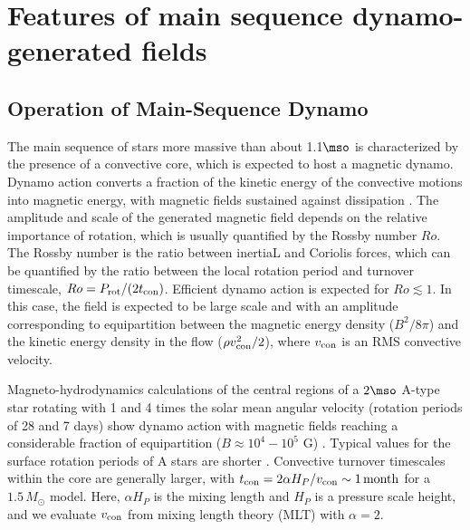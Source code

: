 \section{Features of main sequence dynamo-generated fields}

\subsection{Operation of Main-Sequence Dynamo}

The main sequence of stars more massive than about 1.1$\mso$ is characterized by the presence of a convective core,
which is expected to host a magnetic dynamo. Dynamo action converts a fraction of the kinetic energy 
of the convective motions into magnetic energy, with magnetic fields sustained against dissipation  \citep[see e.g.,][]{Brandenburg_2005}. The amplitude and scale of the generated magnetic field depends on the relative importance of rotation, which is usually quantified by the Rossby number $Ro$. The Rossby number is the ratio between inertiaL and Coriolis forces, which can be quantified by the ratio between the local rotation period and turnover timescale, $Ro = P_{\rm rot}/(2 t_{\rm con})$. 
Efficient dynamo action is expected for $Ro \lesssim 1$. In this case, the field is expected to be large scale and with an amplitude corresponding to equipartition between the magnetic energy density ($B^2/8\pi$) and the kinetic energy density in the flow ($\rho v^2_{\rm con}/2$), where $v_{\rm con}$ is an RMS convective velocity.

Magneto-hydrodynamics calculations of the central regions of a $2\mso$ A-type star rotating with 
1 and 4 times the solar mean angular velocity (rotation periods of 28 and 7 days) show dynamo action 
with magnetic fields reaching a considerable fraction of equipartition ($B \approx 10^4-10^5$ G) \citep{Brun_2005}. Typical values for the surface  rotation periods of A stars are shorter \citep[about 1 day, see e.g.]{Zorec_2012}. Convective turnover timescales within the core are generally larger, with $t_{\rm con} = 2 \alpha H_P/v_{\rm con} \sim 1 \, {\rm month}$ for a $1.5 \, M_\odot$ model. Here, $\alpha H_P$ is the mixing length and $H_P$ is a pressure scale height, and we evaluate $v_{\rm con}$ from mixing length theory (MLT) with $\alpha = 2$. 

